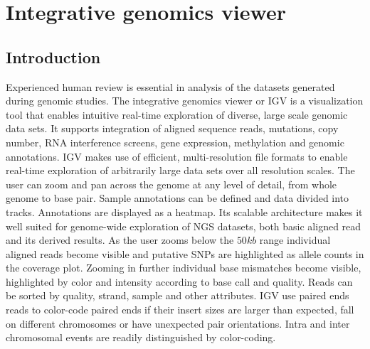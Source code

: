 \graphicspath{{chapters/papers/03/images}}
\chapter{Integrative genomics viewer}

\section{Introduction}
Experienced human review is essential in analysis of the datasets generated during genomic studies.
The integrative genomics viewer or IGV is a visualization tool that enables intuitive real-time exploration of diverse, large scale genomic data sets.
It supports integration of aligned sequence reads, mutations, copy number, RNA interference screens, gene expression, methylation and genomic annotations.
IGV makes use of efficient, multi-resolution file formats to enable real-time exploration of arbitrarily large data sets over all resolution scales.
The user can zoom and pan across the genome at any level of detail, from whole genome to base pair.
Sample annotations can be defined and data divided into tracks.
Annotations are displayed as a heatmap.
Its scalable architecture makes it well suited for genome-wide exploration of NGS datasets, both basic aligned read and its derived results.
As the user zooms below the $50kb$ range individual aligned reads become visible and putative SNPs are highlighted as allele counts in the coverage plot.
Zooming in further individual base mismatches become visible, highlighted by color and intensity according to base call and quality.
Reads can be sorted by quality, strand, sample and other attributes.
IGV use paired ends reads to color-code paired ends if their insert sizes are larger than expected, fall on different chromosomes or have unexpected pair orientations.
Intra and inter chromosomal events are readily distinguished by color-coding.
